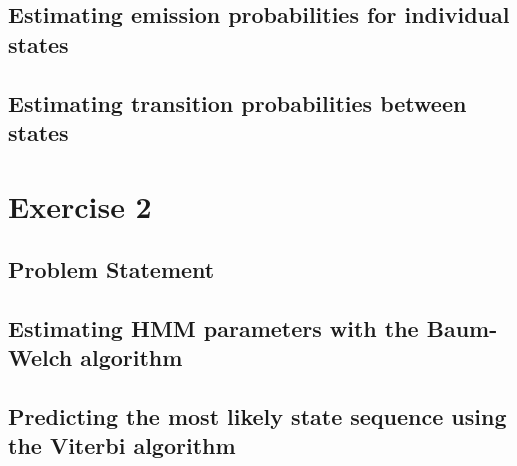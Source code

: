 \documentclass[11pt, oneside]{article}
\begin{document}
\subsection{Estimating emission probabilities for individual states}
\subsection{Estimating transition probabilities between states}

\section{Exercise 2}
\subsection{Problem Statement}
\subsection{Estimating HMM parameters with the Baum-Welch algorithm}
\subsection{Predicting the most likely state sequence using the Viterbi algorithm}
\end{document}
